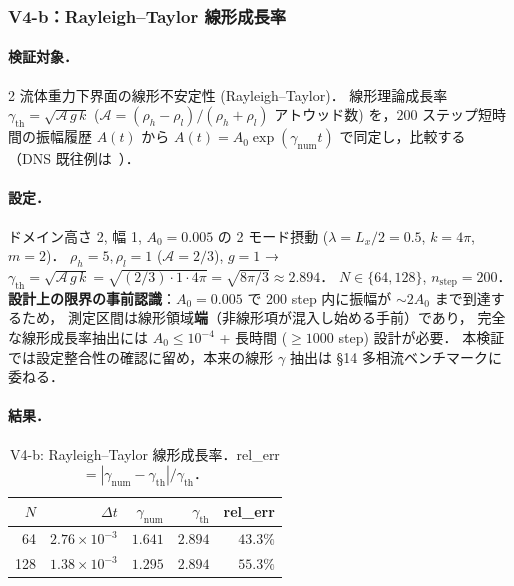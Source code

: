 \subsubsection{V4-b：Rayleigh--Taylor 線形成長率}
\label{sec:rt_linear_growth}

\paragraph{検証対象．}
2 流体重力下界面の線形不安定性 (Rayleigh--Taylor)．
線形理論成長率~\cite{Chandrasekhar1961}
$\gamma_{\mathrm{th}} = \sqrt{\mathcal{A}\, g\, k}$ ($\mathcal{A} = (\rho_h - \rho_l)/(\rho_h + \rho_l)$ アトウッド数)
を，$200$ ステップ短時間の振幅履歴 $A(t)$ から
$A(t) = A_0 \exp(\gamma_{\mathrm{num}} t)$ で同定し，比較する
（DNS 既往例は~\cite{Tryggvason1988,Tryggvason2011}）．

\paragraph{設定．}
ドメイン高さ 2, 幅 1, $A_0 = 0.005$ の 2 モード摂動 ($\lambda = L_x/2 = 0.5$, $k = 4\pi$, $m=2$)．
$\rho_h = 5, \rho_l = 1$ ($\mathcal{A} = 2/3$), $g = 1$ →
$\gamma_{\mathrm{th}} = \sqrt{\mathcal{A}\, g\, k} = \sqrt{(2/3)\!\cdot\!1\!\cdot\!4\pi} = \sqrt{8\pi/3} \approx 2.894$．
$N \in \{64, 128\}$, $n_{\mathrm{step}} = 200$．
\textbf{設計上の限界の事前認識}：$A_0 = 0.005$ で 200 step 内に振幅が $\sim 2 A_0$ まで到達するため，
測定区間は線形領域\textbf{端}（非線形項が混入し始める手前）であり，
完全な線形成長率抽出には $A_0 \le 10^{-4}$ + 長時間 ($\ge 1000$ step) 設計が必要．
本検証では設定整合性の確認に留め，本来の線形 $\gamma$ 抽出は §14 多相流ベンチマークに委ねる．

\paragraph{結果．}
\begin{table}[!ht]
\caption{V4-b: Rayleigh--Taylor 線形成長率．rel\_err $= |\gamma_{\mathrm{num}}-\gamma_{\mathrm{th}}|/\gamma_{\mathrm{th}}$．}
\label{tab:V4_rt}
\centering\small
\begin{tabular}{r r r r r}
\toprule
$N$ & $\Delta t$ & $\gamma_{\mathrm{num}}$ & $\gamma_{\mathrm{th}}$ & rel\_err \\
\midrule
64  & $2.76\times 10^{-3}$ & $1.641$ & $2.894$ & $43.3\%$ \\
128 & $1.38\times 10^{-3}$ & $1.295$ & $2.894$ & $55.3\%$ \\
\bottomrule
\end{tabular}
\end{table}

